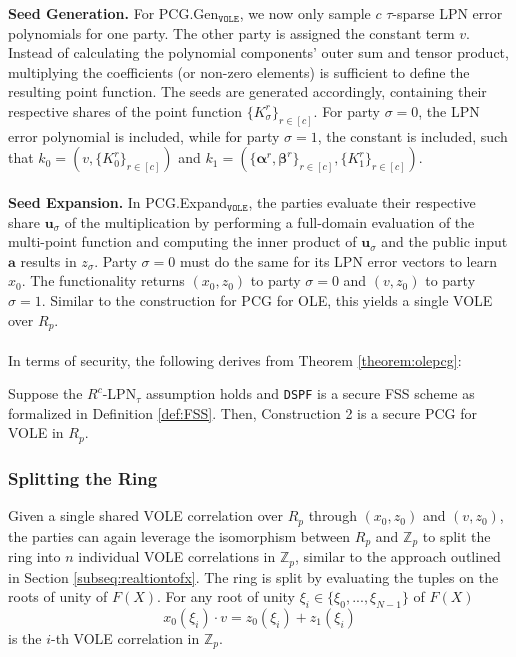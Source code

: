 \textbf{Seed Generation.} For PCG.Gen$_{\texttt{VOLE}}$, we now only sample $c$ $\tau$-sparse LPN error polynomials for one party. The other party is assigned the constant term $v$. Instead of calculating the polynomial components' outer sum and tensor product, multiplying the coefficients (or non-zero elements) is sufficient to define the resulting point function. The seeds are generated accordingly, containing their respective shares of the point function $\{K_\sigma^{r}\}_{r\in[c]}$. For party $\sigma=0$, the LPN error polynomial is included, while for party $\sigma=1$, the constant is included, such that $k_0 = (v, \{K_0^{r}\}_{r\in[c]})$ and $k_1 = (\{\boldsymbol{\alpha}^r, \boldsymbol{\beta}^r\}_{r\in[c]}, \{K_1^{r}\}_{r\in[c]})$. 
\\\\
\textbf{Seed Expansion.} In PCG.Expand$_{\texttt{VOLE}}$, the parties evaluate their respective share $\boldsymbol{u}_\sigma$ of the multiplication by performing a full-domain evaluation of the multi-point function and computing the inner product of $\boldsymbol{u}_\sigma$ and the public input $\boldsymbol{a}$ results in $z_\sigma$. Party $\sigma=0$ must do the same for its LPN error vectors to learn $x_0$. The functionality returns $(x_0, z_0)$ to party $\sigma=0$ and $(v, z_0)$ to party $\sigma=1$. Similar to the construction for PCG for OLE, this yields a single VOLE over $R_p$. 
\\\\
In terms of security, the following derives from Theorem \ref{theorem:olepcg}: 
\begin{theorem}
Suppose the $R^c$-LPN$_\tau$ assumption holds and \texttt{DSPF} is a secure FSS scheme as formalized in Definition \ref{def:FSS}. Then, Construction 2 is a secure PCG for VOLE in $R_p$.
\end{theorem}

\subsubsection{Splitting the Ring}
Given a single shared VOLE correlation over $R_p$ through $(x_0, z_0)$ and $(v, z_0)$, the parties can again leverage the isomorphism between $R_p$ and $\mathbb{Z}_{p}$ to split the ring into $n$ individual VOLE correlations in $\mathbb{Z}_{p}$, similar to the approach outlined in Section \ref{subseq:realtiontofx}. The ring is split by evaluating the tuples on the roots of unity of $F(X)$. For any root of unity $\xi_i \in \{\xi_0, ...,\xi_{N-1}\}$ of $F(X)$
\begin{equation}
x_0(\xi_i) \cdot v = z_0(\xi_i)+ z_1(\xi_i)
\end{equation}
is the $i$-th VOLE correlation in $\mathbb{Z}_{p}$.

